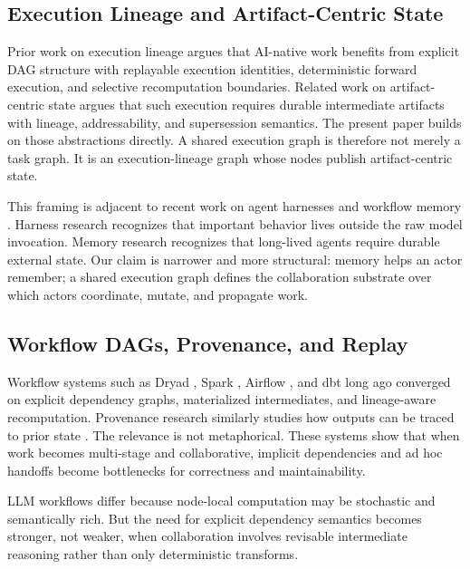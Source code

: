 \documentclass{article}
\begin{document}
\subsection{Execution Lineage and Artifact-Centric State}

Prior work on execution lineage argues that AI-native work benefits from explicit DAG structure with replayable execution identities, deterministic forward execution, and selective recomputation boundaries. Related work on artifact-centric state argues that such execution requires durable intermediate artifacts with lineage, addressability, and supersession semantics. The present paper builds on those abstractions directly. A shared execution graph is therefore not merely a task graph. It is an execution-lineage graph whose nodes publish artifact-centric state.

This framing is adjacent to recent work on agent harnesses and workflow memory \cite{pan2026nlah,zhang2025harness,wang2024awm,fan2024workflowllm,han2025legomem,yan2025memoryr1,borro2026memori}. Harness research recognizes that important behavior lives outside the raw model invocation. Memory research recognizes that long-lived agents require durable external state. Our claim is narrower and more structural: memory helps an actor remember; a shared execution graph defines the collaboration substrate over which actors coordinate, mutate, and propagate work.

\subsection{Workflow DAGs, Provenance, and Replay}

Workflow systems such as Dryad \cite{isard2007dryad}, Spark \cite{zaharia2016spark}, Airflow \cite{airflowdocs}, and dbt \cite{dbtdocs} long ago converged on explicit dependency graphs, materialized intermediates, and lineage-aware recomputation. Provenance research similarly studies how outputs can be traced to prior state \cite{buneman2001why,freire2008provenance}. The relevance is not metaphorical. These systems show that when work becomes multi-stage and collaborative, implicit dependencies and ad hoc handoffs become bottlenecks for correctness and maintainability.

LLM workflows differ because node-local computation may be stochastic and semantically rich. But the need for explicit dependency semantics becomes stronger, not weaker, when collaboration involves revisable intermediate reasoning rather than only deterministic transforms.
\end{document}
